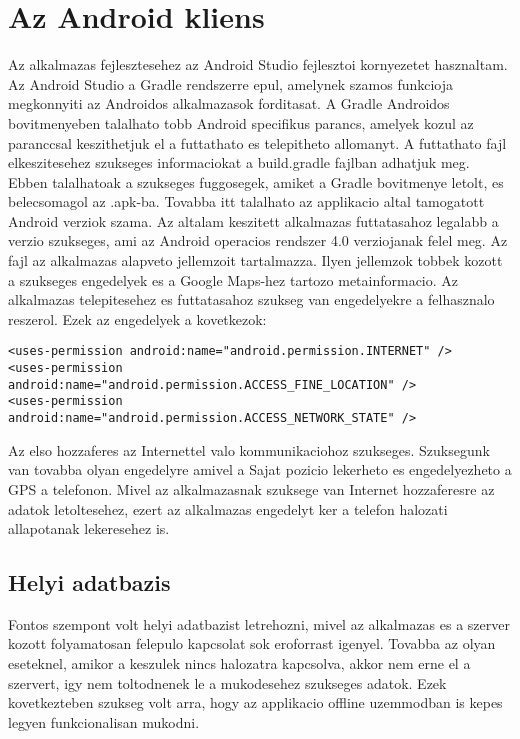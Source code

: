 \section{Az Android kliens}
\label{androidclient}
Az alkalmazas fejlesztesehez az Android Studio fejlesztoi kornyezetet hasznaltam.
Az Android Studio a Gradle rendszerre epul, amelynek szamos funkcioja megkonnyiti az Androidos alkalmazasok forditasat.
A Gradle Androidos bovitmenyeben talalhato tobb Android specifikus parancs, amelyek kozul az  paranccsal keszithetjuk el a futtathato es telepitheto allomanyt.
A futtathato fajl elkeszitesehez szukseges informaciokat a build.gradle fajlban adhatjuk meg.
Ebben talalhatoak a szukseges fuggosegek, amiket a Gradle bovitmenye letolt, es belecsomagol az .apk-ba.
Tovabba itt talalhato az applikacio altal tamogatott Android verziok szama.
Az altalam keszitett alkalmazas futtatasahoz legalabb a  verzio szukseges, ami az Android operacios rendszer 4.0 verziojanak felel meg.
Az  fajl az alkalmazas alapveto jellemzoit tartalmazza.
Ilyen jellemzok tobbek kozott a szukseges engedelyek es a Google Maps-hez tartozo metainformacio.
Az alkalmazas telepitesehez es futtatasahoz szukseg van engedelyekre a felhasznalo reszerol.
Ezek az engedelyek a kovetkezok:
\begin{lstlisting}
<uses-permission android:name="android.permission.INTERNET" /> 
<uses-permission android:name="android.permission.ACCESS_FINE_LOCATION" />
<uses-permission android:name="android.permission.ACCESS_NETWORK_STATE" />
\end{lstlisting}

Az elso hozzaferes az Internettel valo kommunikaciohoz szukseges.
Szuksegunk van tovabba olyan engedelyre amivel a Sajat pozicio lekerheto es engedelyezheto a GPS a telefonon.
Mivel az alkalmazasnak szuksege van Internet hozzaferesre az adatok letoltesehez, ezert az alkalmazas engedelyt ker a telefon halozati allapotanak lekeresehez is.

\subsection*{Helyi adatbazis}
\label{localdatabase}
Fontos szempont volt helyi adatbazist letrehozni, mivel az alkalmazas es a szerver kozott folyamatosan felepulo kapcsolat sok eroforrast igenyel.
Tovabba az olyan eseteknel, amikor a keszulek nincs halozatra kapcsolva, akkor nem erne el a szervert, igy nem toltodnenek le a mukodesehez szukseges adatok.
Ezek kovetkezteben szukseg volt arra, hogy az applikacio offline uzemmodban is kepes legyen funkcionalisan mukodni.

